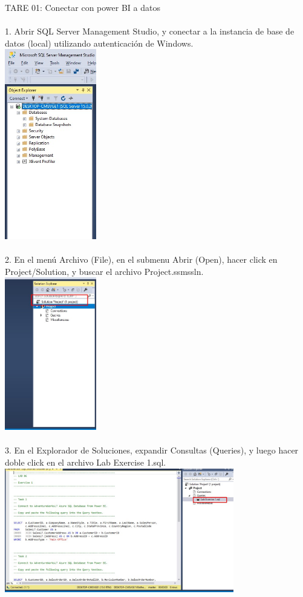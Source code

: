 \documentclass[preprint,12pt]{elsarticle}
\begin{document}
	\begin{itemize}
			TARE 01: Conectar con power BI a datos \\
		
		 		\\ 1. Abrir SQL Server Management Studio, y conectar a la instancia de base de datos (local) utilizando
		 		autenticación de Windows.
		 		 \\ \includegraphics[width=4cm]{./IMAGENES/1.1.1} \\
		 		\\ 2. En el menú Archivo (File), en el submenu Abrir (Open), hacer click en Project/Solution, y buscar el archivo
		 		Project.ssmssln.
		 		\\ \includegraphics[width=4cm]{./IMAGENES/1.1.2} \\
		 		\\ 3. En el Explorador de Soluciones, expandir Consultas (Queries), y luego hacer doble click en el archivo Lab
		 		Exercise 1.sql.
		 	\\ \includegraphics[width=10cm]{./IMAGENES/1.1.3} \\

\end{itemize}
\end{document}
